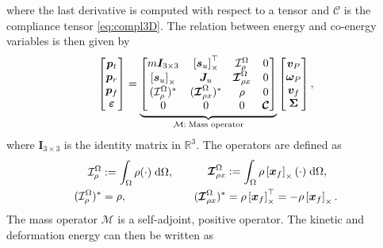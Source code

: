where the last derivative is computed with respect to a tensor and $\bm{\mathcal{C}}$ is the compliance tensor \eqref{eq:compl3D}. The relation between energy and co-energy variables is then given by
\begin{equation}
\label{eq:mass_op}
\begin{bmatrix}
\bm{p}_t \\ \bm{p}_r \\ \bm{p}_f \\ \bm\varepsilon \\
\end{bmatrix} = 
\underbrace{\begin{bmatrix}
	m \bm{I}_{3\times 3} & \left[\bm{s}_u\right]_\times^\top & \mathcal{I}_\rho^{\Omega} & 0 \\
	\left[\bm{s}_u\right]_\times & \bm{J}_u & \bm{\mathcal{I}}_{\rho x}^{\Omega} & 0  \\
	(\mathcal{I}_\rho^{\Omega})^* & (\bm{\mathcal{I}}_{\rho x}^{\Omega})^* & \rho & 0  \\
	0 & 0 & 0 & \bm{\mathcal{C}} \\
	\end{bmatrix}}_{{\mathcal{M}}: \; \text{Mass operator}}
\begin{bmatrix}
\bm{v}_P \\ \bm{\omega}_P  \\ \bm{v}_f  \\ \bm\Sigma \\
\end{bmatrix},
\end{equation}
where $\bm{I}_{3\times 3}$ is the identity matrix in $\mathbb{R}^3$. The operators are defined as
\begin{equation*}
\begin{aligned}
\mathcal{I}_\rho^\Omega &:=\int_{\Omega} \rho (\cdot) \d{\Omega}, \\
(\mathcal{I}_\rho^{\Omega})^* &= \rho, \\
\end{aligned} \qquad
\begin{aligned} 
\bm{\mathcal{I}}_{\rho x}^{\Omega} &:= \int_\Omega \rho \crmat{\bm{x}_f} (\cdot) \d{\Omega}, \\
(\bm{\mathcal{I}}_{\rho x}^{\Omega})^* &= \rho \crmat{\bm{x}_f}^\top= -\rho \crmat{\bm{x}_f}. \\
\end{aligned}
\end{equation*}
The mass operator $\mathcal{M}$ is a self-adjoint, positive operator. The kinetic and deformation energy can then be written as
